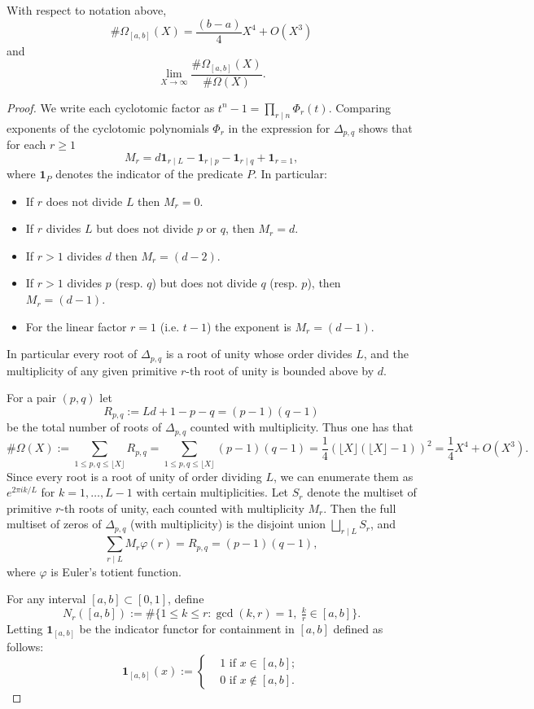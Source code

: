 \documentclass[10pt,a4paper]{amsart}
\begin{document}
\begin{theorem}\label{section 3 main thm 2}
    With respect to notation above, 
\begin{equation}\label{Omega asymptotic 1}\#\Omega_{[a,b]}(X)=\frac{(b-a)}{4} X^4+O(X^3)\end{equation}\noindent and\begin{equation}\label{Omega asymptotic 2}\lim_{X\rightarrow \infty} \frac{\#\Omega_{[a,b]}(X)}{\#\Omega(X)}.\end{equation}
\end{theorem}

\begin{proof}
\par We write each cyclotomic factor as \(t^n-1=\prod_{r\mid n}\Phi_r(t)\). Comparing exponents of the cyclotomic polynomials \(\Phi_r\) in the expression for \(\Delta_{p,q}\) shows that for each \(r\ge1\)
\[
M_r= d \mathbf{1}_{r\mid L}-\mathbf{1}_{r\mid p}-\mathbf{1}_{r\mid q} + \mathbf{1}_{r=1},
\]
where \(\mathbf{1}_{P}\) denotes the indicator of the predicate \(P\). In particular:
\begin{itemize}
    \item If $r$ does not divide $L$ then $M_r=0$.
 \item If $r$ divides $L$ but does not divide $p$ or $q$, then $M_r=d$.
  \item If \(r>1\) divides \(d\) then
  \(M_r=(d-2)\).
  \item If \(r>1\) divides $p$ (resp. $q$) but does not divide $q$ (resp. $p$), then \(M_r=(d-1)\).
  \item For the linear factor \(r=1\) (i.e. \(t-1\)) the exponent is \(M_r=(d-1)\).
\end{itemize}
In particular every root of \(\Delta_{p,q}\) is a root of unity whose order divides \(L\), and the multiplicity of any given primitive \(r\)-th root of unity is bounded above by \(d\). 
\par For a pair \((p,q)\) let
\[R_{p,q}:=Ld+1-p-q=(p-1)(q-1)\] be the total number of roots of \(\Delta_{p,q}\) counted with multiplicity. Thus one has that
\[
\#\Omega(X):=\sum_{1\le p,q\le\lfloor X\rfloor} R_{p,q}=\sum_{1\le p,q\le\lfloor X\rfloor} (p-1)(q-1)=\frac{1}{4}\left(\lfloor X\rfloor(\lfloor X\rfloor-1)\right)^2=\frac{1}{4}X^4+O(X^3).
\]
Since every root is a root of unity of order dividing \(L\),
we can enumerate them as \(e^{2\pi i k/L}\) for \(k=1,\dots,L-1\) with certain multiplicities. Let $S_r$ denote the multiset of primitive $r$-th roots of unity, each counted with multiplicity $M_r$.  Then the full multiset of zeros of $\Delta_{p,q}$ (with multiplicity) is the disjoint union $\bigsqcup_{r\mid L} S_r$, and 
\[\sum_{r\mid L} M_r\varphi(r)
=R_{p,q}=(p-1)(q-1),
\]
where $\varphi$ is Euler's totient function.
\par For any interval $[a,b]\subset[0,1]$, define
\[
N_r([a,b]) := \#\{1\le k\le r : \gcd(k,r)=1,\ \tfrac{k}{r}\in[a,b]\}.
\]
Letting $\mathbf{1}_{[a,b]}$ be the indicator functor for containment in $[a,b]$ defined as follows:
\[\mathbf{1}_{[a,b]}(x):=\begin{cases}
    & 1\text{ if }x\in [a,b];\\
    & 0\text{ if }x\notin [a,b].
\end{cases}\]


\end{proof}
\end{document}
